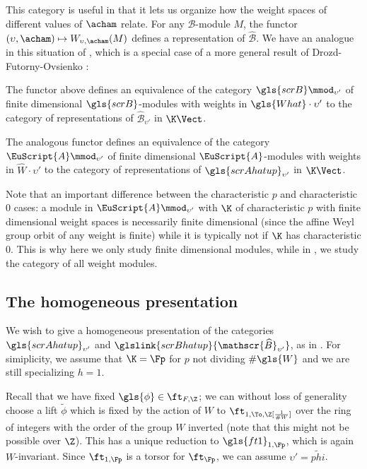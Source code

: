 This category is useful in that it lets us organize how the weight spaces
of different values of $\acham$ relate.  For any $\mathscr{B}$-module
$M$, the functor $(\upsilon, \acham)\mapsto W_{\upsilon,\acham}(M)$
defines a representation of $\widehat{\mathscr{B}}$.  We have an
analogue in this situation of \cite[Lemma 3.11]{WebSD}, which is a
special case of a more general result of Drozd-Futorny-Ovsienko
\cite[Th. 17]{FOD}:
\begin{lemma}
  The functor above defines an equivalence of the category $\gls{scrB}\mmod_{\upsilon'}$ of finite dimensional $\gls{scrB}$-modules with weights in $\gls{What}\cdot \upsilon'$ to
  the category of representations of
  $\widehat{\mathscr{B}}_{\upsilon'}$ in $\K\Vect$.

The analogous functor defines an equivalence of the category $\EuScript{A}\mmod_{\upsilon'}$ of finite dimensional
$\EuScript{A}$-modules  with weights in
$\widehat{W}\cdot \upsilon'$ to the category of
representations of $\gls{scrAhatup}_{\upsilon'}$ in $\K\Vect$.
\end{lemma} 
Note that an important difference
between the characteristic $p$ and characteristic $0$ cases:
a module in $\EuScript{A}\mmod_{\upsilon'}$ with $\K$ of characteristic $p$ with finite dimensional
weight spaces is necessarily finite dimensional (since the affine Weyl
group orbit of any weight is finite) while it is typically not if $\K$
has 
characteristic $0$. This is why here we only study finite dimensional
modules, while in \cite{WebSD}, we study the category of all weight modules.


\subsection{The homogeneous presentation}
\label{sec:homo}
We wish to give a homogeneous presentation of the categories
$\gls{scrAhatup}_{\upsilon'}$ and
$\glslink{scrBhatup}{\mathscr{\widehat{B}}_{\upsilon'}}$, as in
\cite[\S 4]{WebSD}.  For simiplicity, we assume that $\K=\Fp$ for
$p$ not dividing $\# \gls{W}$ and we are still specializing $h=1$.  


Recall that we have fixed $\gls{\phi}\in \ft_{F,\Z}$; we can without
loss of generality choose a lift $\tilde{\phi}$ which is fixed by the action of $W$  to $\ft_{1,\To,
  \Z[\frac{1}{\# W}]}$ over the ring of integers with the order of the
group $W$ inverted 
(note that this might not be
possible over $\Z$).   This has a unique reduction to
$\gls{ft1}_{1,\Fp}$, which is again $W$-invariant.  Since
$\ft_{1,\Fp}$ is a torsor for $\ft_{\Fp}$, we can assume $\upsilon'=\tilde{phi}$.

